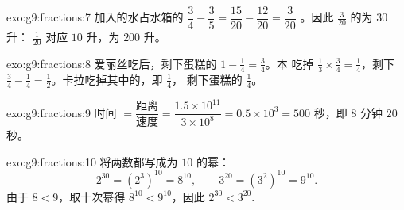 \begin{solution}{exo:g9:fractions:7}
加入的水占水箱的
$\dfrac34 - \dfrac35 = \dfrac{15}{20} - \dfrac{12}{20} = \dfrac{3}{20}$
。因此 $\frac{3}{20}$ 的为 $30$ 升：
$\frac{1}{20}$ 对应 $10$ 升，为 $200$ 升。
\end{solution}

\begin{solution}{exo:g9:fractions:8}
爱丽丝吃后，剩下蛋糕的 $1 - \frac14 = \frac34$。本
吃掉 $\frac13 \times \frac34 = \frac14$，剩下
$\frac34 - \frac14 = \frac12$。卡拉吃掉其中的，即 $\frac14$，
剩下蛋糕的 $\frac14$。
\end{solution}

\begin{solution}{exo:g9:fractions:9}
时间 $= \dfrac{\text{距离}}{\text{速度}} =
\dfrac{1.5 \times 10^{11}}{3 \times 10^8} = 0.5 \times 10^3 = 500$
秒，即 $8$ 分钟 $20$ 秒。
\end{solution}

\begin{solution}{exo:g9:fractions:10}
将两数都写成为 $10$ 的幂：
\[
2^{30} = \left(2^3\right)^{10} = 8^{10},
\qquad
3^{20} = \left(3^2\right)^{10} = 9^{10}.
\]
由于 $8 < 9$，取十次幂得 $8^{10} < 9^{10}$，因此
$2^{30} < 3^{20}$.
\end{solution}

